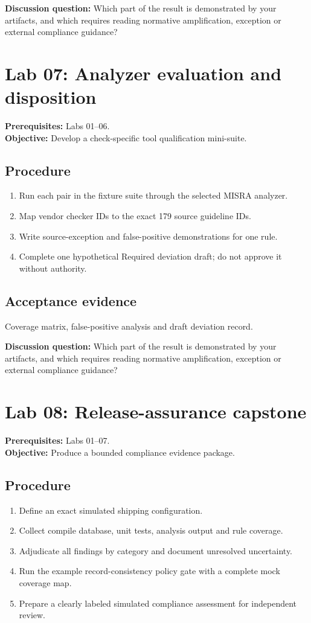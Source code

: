 \documentclass[10pt,letterpaper]{article}
\begin{document}
\textbf{Discussion question:} Which part of the result is demonstrated by your artifacts, and which requires reading normative amplification, exception or external compliance guidance?\par

\section{Lab 07: Analyzer evaluation and disposition}
\textbf{Prerequisites:} Labs 01--06.\\\textbf{Objective:} Develop a check-specific tool qualification mini-suite.

\subsection{Procedure}
\begin{enumerate}
\item Run each pair in the fixture suite through the selected MISRA analyzer.
\item Map vendor checker IDs to the exact 179 source guideline IDs.
\item Write source-exception and false-positive demonstrations for one rule.
\item Complete one hypothetical Required deviation draft; do not approve it without authority.
\end{enumerate}

\subsection{Acceptance evidence}
Coverage matrix, false-positive analysis and draft deviation record.

\textbf{Discussion question:} Which part of the result is demonstrated by your artifacts, and which requires reading normative amplification, exception or external compliance guidance?\par

\section{Lab 08: Release-assurance capstone}
\textbf{Prerequisites:} Labs 01--07.\\\textbf{Objective:} Produce a bounded compliance evidence package.

\subsection{Procedure}
\begin{enumerate}
\item Define an exact simulated shipping configuration.
\item Collect compile database, unit tests, analysis output and rule coverage.
\item Adjudicate all findings by category and document unresolved uncertainty.
\item Run the example record-consistency policy gate with a complete mock coverage map.
\item Prepare a clearly labeled simulated compliance assessment for independent review.
\end{enumerate}
\end{document}
